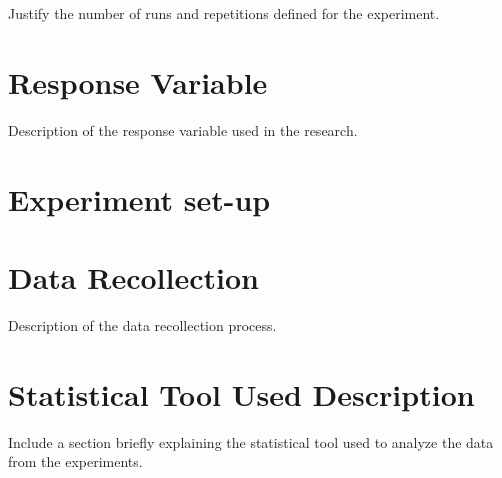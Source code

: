 Justify the number of runs and repetitions defined for the experiment.


\section{Response Variable}
Description of the response variable used in the research.

\section{Experiment set-up}

\section{Data Recollection}

Description of the data recollection process. 

\section{Statistical Tool Used Description}

Include a section briefly explaining the statistical tool used to analyze the data from the experiments.